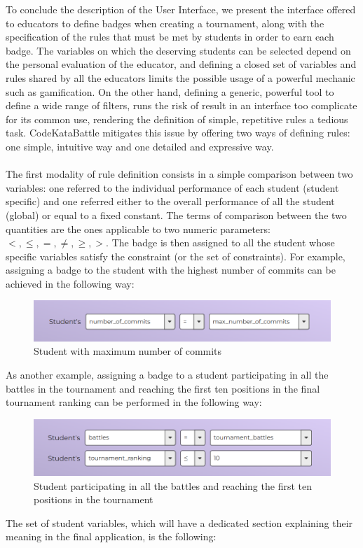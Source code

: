 To conclude the description of the User Interface, we present the interface offered to educators to define badges when creating a tournament, along with the specification of the rules that must be met by students in order to earn each badge. The variables on which the deserving students can be selected depend on the personal evaluation of the educator, and defining a closed set of variables and rules shared by all the educators limits the possible usage of a powerful mechanic such as gamification. On the other hand, defining a generic, powerful tool to define a wide range of filters, runs the risk of result in an interface too complicate for its common use, rendering the definition of simple, repetitive rules a tedious task. CodeKataBattle mitigates this issue by offering two ways of defining rules: one simple, intuitive way and one detailed and expressive way.\\
\\
The first modality of rule definition consists in a simple comparison between two variables: one referred to the individual performance of each student (student specific) and one referred either to the overall performance of all the student (global) or equal to a fixed constant. The terms of comparison between the two quantities are the ones applicable to two numeric parameters: $<,\leq,=,\neq,\geq,>$. The badge is then assigned to all the student whose specific variables satisfy the constraint (or the set of constraints). For example, assigning a badge to the student with the highest number of commits can be achieved in the following way:
\begin{figure}[H]
    \centering
    \includegraphics[width=0.9\linewidth]{Images/UI_Badge_form1.png}
    \caption{Student with maximum number of commits}
    \label{fig:UI_form1}
\end{figure}
As another example, assigning a badge to a student participating in all the battles in the tournament and reaching the first ten positions in the final tournament ranking can be performed in the following way:
\begin{figure}[H]
    \centering
    \includegraphics[width=0.9\linewidth]{Images/UI_Badge_form2.png}
    \caption{Student participating in all the battles and reaching the first ten positions in the tournament}
    \label{fig:UI_form2}
\end{figure}
The set of student variables, which will have a dedicated section explaining their meaning in the final application, is the following:

